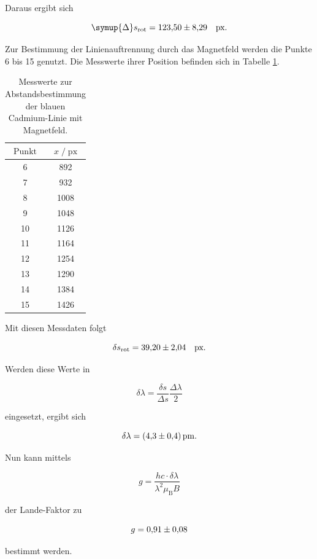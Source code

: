 Daraus ergibt sich 

\begin{equation*}
    \symup{\Delta} s_\text{rot} = \num{123.5+-8.29}\quad\text{px}.
\end{equation*}

Zur Bestimmung der Linienauftrennung durch das Magnetfeld werden die Punkte 6 bis 15 genutzt. Die Messwerte ihrer Position befinden sich in 
Tabelle \ref{tab:mess7}. 

\begin{table}[H]
    \centering
    \caption{Messwerte zur Abstandsbestimmung der blauen Cadmium-Linie mit Magnetfeld.}
    \label{tab:mess7}
    \begin{tabular}{c c}
    \toprule
    $\text{Punkt}$ & $x \;/\; \text{px}$ \\
    \midrule
        6 & 892\\
        7 & 932\\
        8 & 1008\\
        9 & 1048\\
        10 & 1126\\
        11 & 1164\\
        12 & 1254\\
        13 & 1290\\
        14 & 1384\\
        15 & 1426\\
    \bottomrule
    \end{tabular}
\end{table}

Mit diesen Messdaten folgt

\begin{equation*}
    \delta s_\text{rot} = \num{39.2+-2.04}\quad \text{px}.    
\end{equation*}

Werden diese Werte in 

\begin{equation*}
    \delta \lambda = \frac{\delta s}{\Delta s}\frac{\Delta \lambda}{2}
\end{equation*}

eingesetzt, ergibt sich 

\begin{equation*}
    \delta \lambda = \SI{4.3+-0.4}{\pico\metre}.
\end{equation*}

Nun kann mittels 

\begin{equation}
    g = \frac{hc\cdot\delta\lambda}{\lambda^2\mu_\text{B}B}
\end{equation}

der Lande-Faktor zu 

\begin{equation*}
    g = \num{0.91+-0.08}
\end{equation*}

bestimmt werden. 